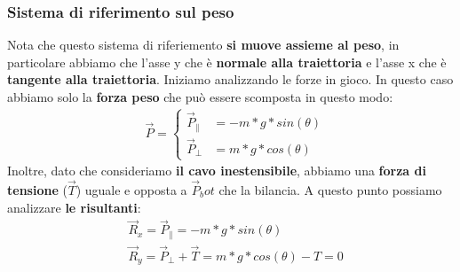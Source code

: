         \subsubsection{Sistema di riferimento sul peso}
            Nota che questo sistema di riferiemento \textbf{si muove assieme al peso}, in particolare abbiamo che l'asse y che è \textbf{normale alla traiettoria} e l'asse x che è \textbf{tangente alla traiettoria}. Iniziamo analizzando le forze in gioco. In questo caso abbiamo solo la \textbf{forza peso} che può essere scomposta in questo modo:
            \begin{align*}
                &\vec{P}=
                \begin{cases}
                    \vec{P}_\parallel &= -m*g*sin(\theta)\\
                    \vec{P}_\bot &= m*g*cos(\theta)
                \end{cases}
            \end{align*}
            Inoltre, dato che consideriamo \textbf{il cavo inestensibile}, abbiamo una \textbf{forza di tensione} ($\vec{T}$) uguale e opposta a $\vec{P}_bot$ che la bilancia. A questo punto possiamo analizzare \textbf{le risultanti}:
            \begin{align*}
                &\vec{R}_x =\vec{P}_\parallel= -m*g*sin(\theta)\\
                &\vec{R}_y =\vec{P}_\bot + \vec{T}= m*g*cos(\theta) - T = 0
            \end{align*}


